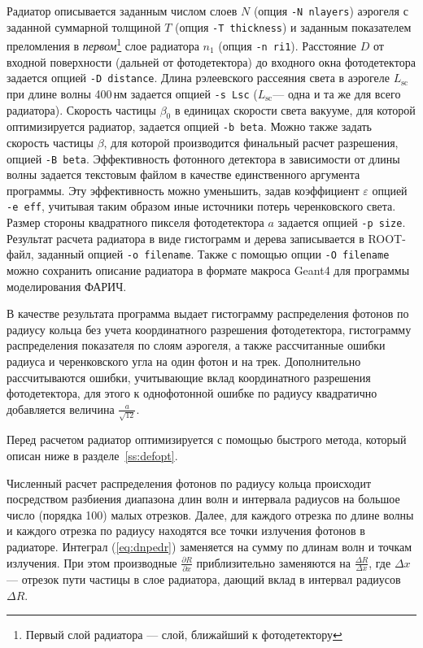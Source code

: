 \documentclass[12pt]{article}
\newcommand{\lsc}{\ensuremath{L_\mathrm{sc}}\xspace}
\newcommand{\betaop}{\ensuremath{\beta_\mathrm{0}}\xspace}
\begin{document}
Радиатор описывается заданным числом слоев $N$ (опция {\tt -N nlayers}) аэрогеля с заданной суммарной толщиной $T$ (опция {\tt -T thickness}) и 
заданным показателем преломления в {\em первом}\footnote{Первый слой радиатора --- слой, ближайший к фотодетектору} слое радиатора $n_1$ (опция {\tt -n ri1}). 
Расстояние $D$ от входной поверхности (дальней от фотодетектора) до входного окна фотодетектора задается опцией {\tt -D distance}.
Длина рэлеевского рассеяния света в аэрогеле \lsc при длине волны 400\,нм задается опцией {\tt -s Lsc} (\lsc --- одна и та же для всего радиатора). 
Скорость частицы \betaop в единицах скорости света вакууме, для которой оптимизируется радиатор, задается опцией {\tt -b beta}. 
Можно также задать скорость частицы $\beta$, для которой производится финальный расчет разрешения, опцией {\tt -B beta}.
Эффективность фотонного детектора в зависимости от длины волны задается текстовым файлом в качестве единственного аргумента программы. 
Эту эффективность можно уменьшить, задав коэффициент $\varepsilon$ опцией {\tt -e eff}, учитывая таким образом иные источники потерь черенковского света. 
Размер стороны квадратного пикселя фотодетектора $a$ задается опцией {\tt -p size}. Результат расчета радиатора в виде гистограмм и дерева записывается 
в ROOT-файл, заданный опцией {\tt -o filename}. Также с помощью опции {\tt -O filename} можно сохранить описание радиатора в формате макроса Geant4 
для программы моделирования ФАРИЧ.

В качестве результата программа выдает гистограмму распределения фотонов по радиусу кольца без учета координатного разрешения фотодетектора, гистограмму
распределения показателя по слоям аэрогеля, а также рассчитанные ошибки радиуса и черенковского угла на один фотон и на трек. 
Дополнительно рассчитываются ошибки, учитывающие вклад координатного разрешения 
фотодетектора, для этого к однофотонной ошибке по радиусу квадратично добавляется величина $\frac{a}{\sqrt{12}}$.

Перед расчетом радиатор оптимизируется с помощью быстрого метода, который описан ниже в разделе~\ref{ss:defopt}.

Численный расчет распределения фотонов по радиусу кольца происходит посредством разбиения диапазона длин волн и интервала 
радиусов на большое число (порядка 100) малых отрезков. Далее, для каждого отрезка по длине волны и каждого отрезка по радиусу находятся 
все точки излучения фотонов в радиаторе. Интеграл (\ref{eq:dnpedr}) заменяется на сумму по длинам волн и точкам излучения.
При этом производные $\frac{\partial R}{\partial x}$ приблизительно заменяются на $\frac{\Delta R}{\Delta x}$, где $\Delta x$ --- отрезок пути частицы 
в слое радиатора, дающий вклад в интервал радиусов $\Delta R$.
\end{document}
